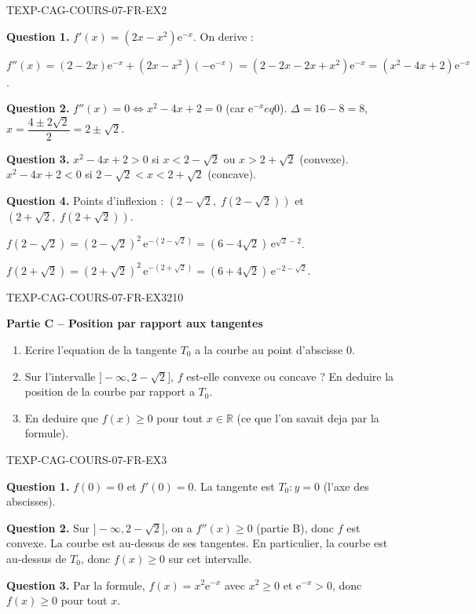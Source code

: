 \begin{corrige}{TEXP-CAG-COURS-07-FR-EX2}

\textbf{Question 1.} $f'(x) = (2x - x^2)\mathrm{e}^{-x}$. On derive :

$f''(x) = (2 - 2x)\mathrm{e}^{-x} + (2x - x^2)(-\mathrm{e}^{-x}) = (2 - 2x - 2x + x^2)\mathrm{e}^{-x} = (x^2 - 4x + 2)\mathrm{e}^{-x}$.

\textbf{Question 2.} $f''(x) = 0 \iff x^2 - 4x + 2 = 0$ (car $\mathrm{e}^{-x} 
eq 0$). $\Delta = 16 - 8 = 8$, $x = \dfrac{4 \pm 2\sqrt{2}}{2} = 2 \pm \sqrt{2}$.

\textbf{Question 3.} $x^2 - 4x + 2 > 0$ si $x < 2 - \sqrt{2}$ ou $x > 2 + \sqrt{2}$ (convexe). $x^2 - 4x + 2 < 0$ si $2 - \sqrt{2} < x < 2 + \sqrt{2}$ (concave).

\textbf{Question 4.} Points d'inflexion : $(2 - \sqrt{2},\; f(2-\sqrt{2}))$ et $(2 + \sqrt{2},\; f(2+\sqrt{2}))$.

$f(2-\sqrt{2}) = (2-\sqrt{2})^2\,\mathrm{e}^{-(2-\sqrt{2})} = (6-4\sqrt{2})\,\mathrm{e}^{\sqrt{2}-2}$.

$f(2+\sqrt{2}) = (2+\sqrt{2})^2\,\mathrm{e}^{-(2+\sqrt{2})} = (6+4\sqrt{2})\,\mathrm{e}^{-2-\sqrt{2}}$.

\end{corrige}

\bigskip


\begin{exercice}{TEXP-CAG-COURS-07-FR-EX3}{2}{10}

\textbf{Partie C -- Position par rapport aux tangentes}

\begin{enumerate}
  \item Ecrire l'equation de la tangente $T_0$ a la courbe au point d'abscisse $0$.
  \item Sur l'intervalle $]-\infty, 2 - \sqrt{2}]$, $f$ est-elle convexe ou concave ? En deduire la position de la courbe par rapport a $T_0$.
  \item En deduire que $f(x) \geq 0$ pour tout $x \in \mathbb{R}$ (ce que l'on savait deja par la formule).
\end{enumerate}

\end{exercice}

\begin{corrige}{TEXP-CAG-COURS-07-FR-EX3}

\textbf{Question 1.} $f(0) = 0$ et $f'(0) = 0$. La tangente est $T_0 : y = 0$ (l'axe des abscisses).

\textbf{Question 2.} Sur $]-\infty, 2 - \sqrt{2}]$, on a $f''(x) \geq 0$ (partie B), donc $f$ est convexe. La courbe est au-dessus de ses tangentes. En particulier, la courbe est au-dessus de $T_0$, donc $f(x) \geq 0$ sur cet intervalle.

\textbf{Question 3.} Par la formule, $f(x) = x^2 \mathrm{e}^{-x}$ avec $x^2 \geq 0$ et $\mathrm{e}^{-x} > 0$, donc $f(x) \geq 0$ pour tout $x$.

\end{corrige}
